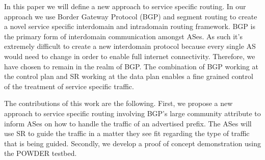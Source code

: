In this paper we will define a new approach to service specific routing. In our approach we use 
Border Gateway Protocol (BGP) and segment routing to create a novel service specific
interdomain and intradomain routing framework. BGP is the primary form of interdomain 
communication amongst ASes. As such it's extremely difficult to create a new interdomain 
protocol because every single AS would need to change in order to enable full internet
connectivity. Therefore, we have chosen to remain in the realm of BGP. The combination of 
BGP working at the control plan and SR working at the data plan enables a fine grained control 
of the treatment of service specific traffic. 

The contributions of this work are the following. First, we propose a new approach to service
specific routing involving BGP's large community attribute to inform ASes on how to handle the
traffic of an advertised prefix. The ASes will use SR to guide the traffic in a matter they see fit
regarding the type of traffic that is being guided. Secondly, we develop a proof of concept 
demonstration using the POWDER testbed. 






